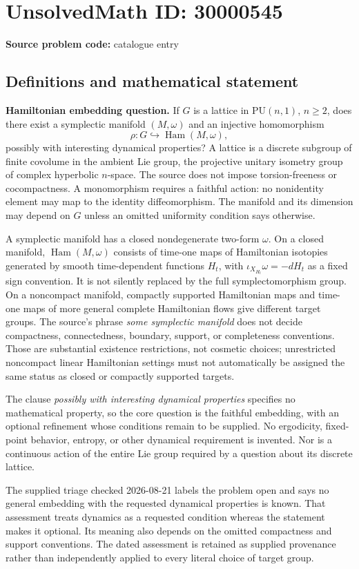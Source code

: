 \documentclass[11pt]{article}
\begin{document}
\section*{UnsolvedMath ID: 30000545}
\textbf{Source problem code:} catalogue entry
\subsection{Definitions and mathematical statement}
\textbf{Hamiltonian embedding question.} If \(G\) is a lattice in \(\mathrm{PU}(n,1)\), \(n\ge2\), does there exist a symplectic manifold \((M,\omega)\) and an injective homomorphism\[\rho:G\hookrightarrow\operatorname{Ham}(M,\omega),\] possibly with interesting dynamical properties? A lattice is a discrete subgroup of finite covolume in the ambient Lie group, the projective unitary isometry group of complex hyperbolic \(n\)-space. The source does not impose torsion-freeness or cocompactness. A monomorphism requires a faithful action: no nonidentity element may map to the identity diffeomorphism. The manifold and its dimension may depend on \(G\) unless an omitted uniformity condition says otherwise.\par A symplectic manifold has a closed nondegenerate two-form \(\omega\). On a closed manifold, \(\operatorname{Ham}(M,\omega)\) consists of time-one maps of Hamiltonian isotopies generated by smooth time-dependent functions \(H_t\), with \(\iota_{X_{H_t}}\omega=-dH_t\) as a fixed sign convention. It is not silently replaced by the full symplectomorphism group. On a noncompact manifold, compactly supported Hamiltonian maps and time-one maps of more general complete Hamiltonian flows give different target groups. The source's phrase \emph{some symplectic manifold} does not decide compactness, connectedness, boundary, support, or completeness conventions. Those are substantial existence restrictions, not cosmetic choices; unrestricted noncompact linear Hamiltonian settings must not automatically be assigned the same status as closed or compactly supported targets.\par The clause \emph{possibly with interesting dynamical properties} specifies no mathematical property, so the core question is the faithful embedding, with an optional refinement whose conditions remain to be supplied. No ergodicity, fixed-point behavior, entropy, or other dynamical requirement is invented. Nor is a continuous action of the entire Lie group required by a question about its discrete lattice.\par The supplied triage checked 2026-08-21 labels the problem open and says no general embedding with the requested dynamical properties is known. That assessment treats dynamics as a requested condition whereas the statement makes it optional. Its meaning also depends on the omitted compactness and support conventions. The dated assessment is retained as supplied provenance rather than independently applied to every literal choice of target group.
\end{document}
